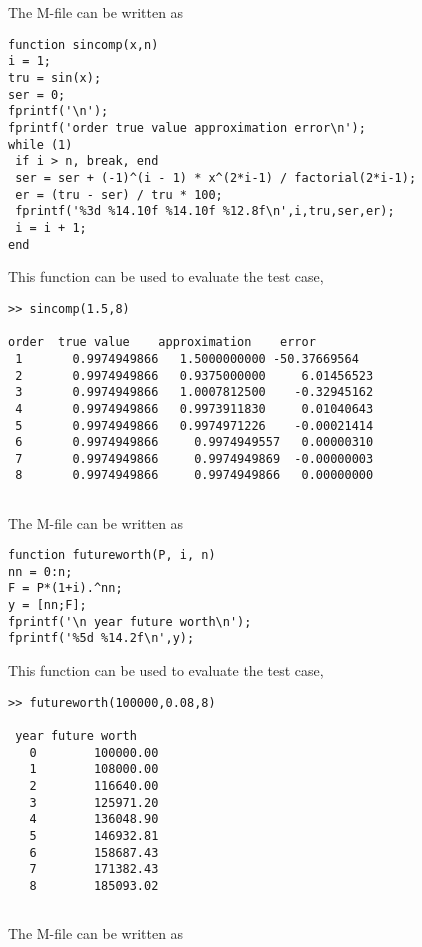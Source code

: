 \documentclass[../main.tex]{subfiles}
\begin{document}
\chapter{}
\label{cha:cha_3}


\section{}
The M-file can be written as
\bigbreak
\begin{lstlisting}[numbers=none]
function sincomp(x,n)
i = 1;
tru = sin(x);
ser = 0;
fprintf('\n');
fprintf('order true value approximation error\n');
while (1)
 if i > n, break, end
 ser = ser + (-1)^(i - 1) * x^(2*i-1) / factorial(2*i-1);
 er = (tru - ser) / tru * 100;
 fprintf('%3d %14.10f %14.10f %12.8f\n',i,tru,ser,er);
 i = i + 1;
end
\end{lstlisting}
\bigbreak
This function can be used to evaluate the test case, 
\bigbreak
\begin{lstlisting}[numbers=none]
>> sincomp(1.5,8)

order  true value    approximation    error
 1		 0.9974949866 	1.5000000000 -50.37669564
 2 		 0.9974949866 	0.9375000000	 6.01456523
 3		 0.9974949866 	1.0007812500 	-0.32945162
 4 		 0.9974949866 	0.9973911830 	 0.01040643
 5		 0.9974949866 	0.9974971226 	-0.00021414
 6 		 0.9974949866	  0.9974949557	 0.00000310
 7  	 0.9974949866	  0.9974949869	-0.00000003
 8 		 0.9974949866	  0.9974949866	 0.00000000
\end{lstlisting}
\bigbreak
\section{}
The M-file can be written as
\bigbreak
\begin{lstlisting}[numbers=none]
function futureworth(P, i, n)
nn = 0:n;
F = P*(1+i).^nn;
y = [nn;F];
fprintf('\n year future worth\n');
fprintf('%5d %14.2f\n',y);
\end{lstlisting}
\bigbreak
This function can be used to evaluate the test case, 
\bigbreak
\begin{lstlisting}[numbers=none]
>> futureworth(100000,0.08,8)

 year future worth
   0 		100000.00
   1 		108000.00
   2 		116640.00
   3 		125971.20
   4 		136048.90
   5 		146932.81
   6 		158687.43
   7 		171382.43
   8 		185093.02 
\end{lstlisting}
\bigbreak\bigbreak
\section{}
The M-file can be written as 
\bigbreak
\end{document}
